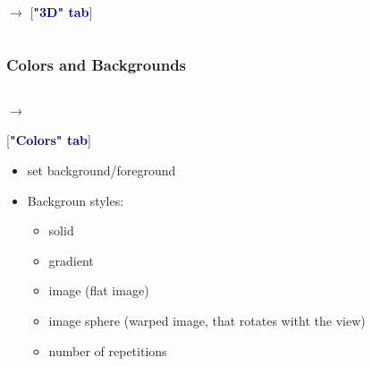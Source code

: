 \begin{frame}
\begin{columns}
\begin{column}{5.25cm}
	\vspace{2mm}
        \textcolor{DarkBlue}{}
         $\rightarrow$ 
		[\textcolor{DarkBlue}{\bf "3D" tab}]
\end{column}
\end{columns}
\end{frame}


\begin{frame}
\frametitle{Colors and Backgrounds}
\begin{columns}
\begin{column}{6cm}
        \textcolor{DarkBlue}{}
         $\rightarrow$ 

	\hspace{5mm}
	[\textcolor{DarkBlue}{\bf "Colors" tab}]

	\begin{itemize}
		\item set background/foreground
		\item Backgroun styles:
		\begin{itemize}
		\item solid
		\item gradient
		\item image (flat image)
		\item image sphere (warped image, that rotates witht the view)
		\item number of repetitions
		\end{itemize}
	\end{itemize}


\end{column}
\end{columns}
\end{frame}
